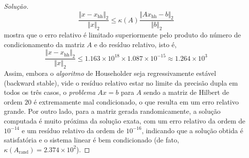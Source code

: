 \documentclass{article}
\begin{document}
\begin{proof}[Solução]
    \begin{equation}\label{des:erro_relativo}
        \frac{\Vert x - x_{\text{hh}} \Vert_2}{\Vert x \Vert_2} \leq \kappa(A) \frac{\Vert A x_{\text{hh}} - b \Vert_2}{\Vert b \Vert_2}
    \end{equation}
    mostra que o erro relativo é limitado superiormente pelo produto do número de condicionamento da matriz \(A\) e do resíduo relativo, isto é, \[
    \frac{\Vert x - x_{\text{hh}} \Vert_2}{\Vert x \Vert_2} \leq 1.163 \times 10^{18} \times 1.087 \times 10^{-15} \approx 1.264 \times 10^{3}
    \] 
    Assim, embora o \emph{algoritmo} de Householder seja regressivamente estável (backward stable), vide o resíduo relativo estar no limite da precisão dupla em todos os três casos, o \emph{problema} \(Ax=b\) para \(A\) sendo a matriz de Hilbert de ordem \(20\) é extremamente mal condicionado, o que resulta em um erro relativo grande. Por outro lado, para a matriz gerada randomicamente, a solução computada é muito próxima da solução exata, com um erro relativo da ordem de \(10^{-14}\) e um resíduo relativo da ordem de \(10^{-16}\), indicando que a solução obtida é satisfatória e o sistema linear é bem condicionado (de fato, \(\kappa(A_{\text{rand}}) = 2.374 \times 10^{2}\)).

\end{proof}
\end{document}
